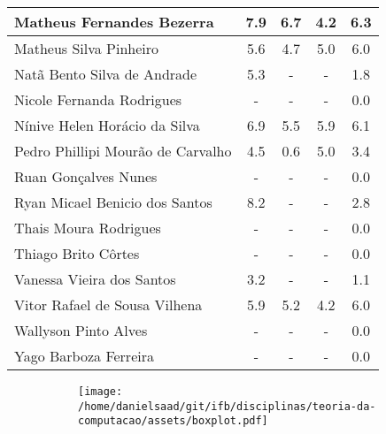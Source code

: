 \documentclass{article}
\begin{document}
\begin{longtable}{|l|c|c|c|c|}
Matheus Fernandes Bezerra & 7.9 & 6.7 & 4.2 & 6.3\\\hline
Matheus Silva Pinheiro & 5.6 & 4.7 & 5.0 & 6.0\\\hline
Natã Bento Silva de Andrade & 5.3 & - & - & 1.8\\\hline
Nicole Fernanda Rodrigues & - & - & - & 0.0\\\hline
Nínive Helen Horácio da Silva & 6.9 & 5.5 & 5.9 & 6.1\\\hline
Pedro Phillipi Mourão de Carvalho & 4.5 & 0.6 & 5.0 & 3.4\\\hline
Ruan Gonçalves Nunes & - & - & - & 0.0\\\hline
Ryan Micael Benicio dos Santos & 8.2 & - & - & 2.8\\\hline
Thais Moura Rodrigues & - & - & - & 0.0\\\hline
Thiago Brito Côrtes & - & - & - & 0.0\\\hline
Vanessa Vieira dos Santos & 3.2 & - & - & 1.1\\\hline
Vitor Rafael de Sousa Vilhena & 5.9 & 5.2 & 4.2 & 6.0\\\hline
Wallyson Pinto Alves & - & - & - & 0.0\\\hline
Yago Barboza Ferreira & - & - & - & 0.0\\\hline
\end{longtable}
\begin{figure}[h!]
\centering\begin{subfigure}
        \centering
        \texttt{[image: /home/danielsaad/git/ifb/disciplinas/teoria-da-computacao/assets/boxplot.pdf]}
    \end{subfigure}\end{figure}
\end{document}
